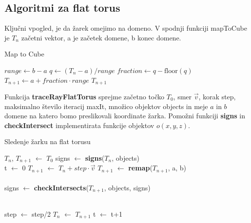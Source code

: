 \documentclass[titlepage]{article}
\begin{document}
\subsection{Algoritmi za flat torus}
Ključni vpogled, je da žarek omejimo na domeno. V spodnji funkciji mapToCube je $T_{n}$ začetni vektor, a je začetek domene, b konec domene.
\begin{algorithm}[H]
\caption{Map to Cube}\label{alg:mapToCube}
\begin{algorithmic}[1]
    \State $range \gets b - a$
    \State $q \gets (T_{n} - a) / range$
    \State $fraction \gets q - \text{floor}(q)$
    \State $T_{n+1} \gets a + fraction \cdot range$
    \State \Return $T_{n+1}$
\EndFunction
\end{algorithmic}
\end{algorithm}

Funkcija \textbf{traceRayFlatTorus} sprejme začetno točko $T_{0}$, smer $\vec{v}$, korak step, maksimalno število iteracij maxIt, množico objektov objects in meje $a$ in $b$ domene na katero bomo preslikovali koordinate žarka.
Pomožni funkciji \textbf{signs} in \textbf{checkIntersect} implementirata funkcije objektov \( o(x,y,z) \).
\begin{algorithm}[H]
    \caption{Sledenje žarku na flat torusu}
\begin{algorithmic}

    \State $T_{n}$, $T_{n+1}$ $\gets$ $T_{0}$
    \State signs $\gets$ \textbf{signs}($T_{n}$, objects)
    \\
    \State t $\gets$ 0
      \State {}
      \State {}
    \EndIf
    \State $T_{n+1}$ $\gets$ $T_{n}+step \cdot \vec{v}$
    \State $T_{n+1}$ $\gets$ \textbf{remap}($T_{n+1}$, a, b)
    \\
    \\
    \State signs $\gets$ \textbf{checkIntersects}($T_{n+1}$, objects, signs)
    \\
    \\

        \State step $\gets$ step/2
    \Else
      \State $T_{n}$ $\gets$ $T_{n+1}$
      \State t $\gets$ t+1
    \EndIf
  \EndWhile
\EndFunction
\end{algorithmic}
\end{algorithm}
\end{document}
